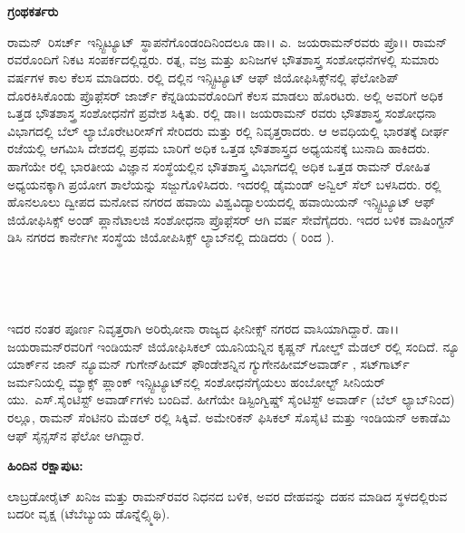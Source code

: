 
\newpage
~ 

\thispagestyle{empty}

~\phantom{a}



\noindent
\begin{minipage}[c]{6cm}
\textbf{\large{ಗ್ರಂಥಕರ್ತರು}}

\medskip
\medskip

{\parfillskip=0pt
ರಾಮನ್~ರಿಸರ್ಚ್~ಇನ್ಸ್ಟಿಟ್ಯೂಟ್~ಸ್ಥಾಪನೆಗೊಂಡಂದಿ\enginline{-}\break ನಿಂದಲೂ ಡಾ।। ಎ.~ಜಯರಾಮನ್‍‌ರವರು ಪ್ರೊ।। ರಾಮನ್ ರವರೊಂದಿಗೆ ನಿಕಟ ಸಂಪರ್ಕದಲ್ಲಿದ್ದರು. ರತ್ನ, ವಜ್ರ ಮತ್ತು ಖನಿಜಗಳ ಭೌತಶಾಸ್ತ್ರ ಸಂಶೋಧನೆಗಳಲ್ಲಿ ಸುಮಾರು  ವರ್ಷಗಳ ಕಾಲ ಕೆಲಸ ಮಾಡಿದರು.  ರಲ್ಲಿ  ದಲ್ಲಿನ ಇನ್ಸ್ಟಿಟ್ಯೂಟ್ ಆಫ್ ಜಿಯೋಫಿಸಿಕ್ಸ್‌ನಲ್ಲಿ ಫೆಲೋಶಿಪ್ ‍ದೊರಕಿಸಿಕೊಂಡು ಪ್ರೊಫೆ಼ಸರ್ ಜಾರ್ಜ್ ಕೆನ್ನಡಿಯವರೊಂದಿಗೆ ಕೆಲಸ ಮಾಡಲು ಹೊರಟರು. ಅಲ್ಲಿ ಅವರಿಗೆ ಅಧಿಕ ಒತ್ತಡ ಭೌತಶಾಸ್ತ್ರ ಸಂಶೋಧನೆಗೆ ಪ್ರವೇಶ ಸಿಕ್ಕಿತು.  ರಲ್ಲಿ ಡಾ।। ಜಯರಾಮನ್ ರವರು ಭೌತಶಾಸ್ತ್ರ ಸಂಶೋಧನಾ ವಿಭಾಗದಲ್ಲಿ ಬೆಲ್ ಲ್ಯಾಬೊರೇಟರೀಸ್‌ಗೆ ಸೇರಿದರು ಮತ್ತು  ರಲ್ಲಿ ನಿವೃತ್ತರಾದರು. ಆ ಅವಧಿಯಲ್ಲಿ  ಭಾರತಕ್ಕೆ ದೀರ್ಘ ರಜೆಯಲ್ಲಿ ಆಗಮಿಸಿ ದೇಶದಲ್ಲಿ ಪ್ರಥಮ ಬಾರಿಗೆ ಅಧಿಕ ಒತ್ತಡ ಭೌತಶಾಸ್ತ್ರದ ಅಧ್ಯಯನಕ್ಕೆ ಬುನಾದಿ ಹಾಕಿದರು. ಹಾಗೆಯೇ  ರಲ್ಲಿ ಭಾರತೀಯ ವಿಜ್ಞಾನ ಸಂಸ್ಥೆಯಲ್ಲಿನ ಭೌತಶಾಸ್ತ್ರ ವಿಭಾಗದಲ್ಲಿ ಅಧಿಕ ಒತ್ತಡ ರಾಮನ್ ರೋಹಿತ ಅಧ‍್ಯಯನಕ್ಕಾಗಿ ಪ್ರಯೋಗ ಶಾಲೆಯನ್ನು ಸಜ್ಜುಗೊಳಿಸಿದರು. ಇದರಲ್ಲಿ ಡೈಮಂಡ್ ಅನ್ವಿಲ್ ಸೆಲ್ ಬಳಸಿದರು.  ರಲ್ಲಿ ಹೊನಲೂಲು ದ್ವೀಪದ ಮನೋವ ನಗರದ ಹವಾಯಿ ವಿಶ್ವವಿದ್ಯಾಲಯದಲ್ಲಿ ಹವಾಯಿಯನ್ ಇನ್ಸ್ಟಿಟ್ಯೂಟ್ ಆಫ್ ಜಿಯೋಫಿಸಿಕ್ಸ್ ಅಂಡ್ ಪ್ಲಾನೆಟಾಲಜಿ ಸಂಶೋಧನಾ ಪ್ರೊಫೆ಼ಸರ್ ಆಗಿ  ವರ್ಷ ಸೇವೆಗೈದರು. ಇದರ ಬಳಿಕ ವಾಷಿಂಗ್ಟನ್ ಡಿಸಿ ನಗರದ ಕಾರ್ನೇಗೀ ಸಂಸ್ಥೆಯ ಜಿಯೋಪಿಸಿಕ್ಸ್ ಲ್ಯಾಬ್‍ನಲ್ಲಿ ದುಡಿದರು ( ರಿಂದ ).\par} 
\end{minipage}

\newpage
~ 

\thispagestyle{empty}

~\phantom{a}



\noindent
\begin{minipage}[c]{6cm}
ಇದರ ನಂತರ ಪೂರ್ಣ ನಿವೃತ್ತರಾಗಿ ಅರಿಝೋನಾ ರಾಜ್ಯದ ಫೀನೀಕ್ಸ್ ನಗರದ ವಾಸಿಯಾಗಿದ್ದಾರೆ.  ಡಾ।। ಜಯರಾಮನ್‌ರವರಿಗೆ ಇಂಡಿಯನ್ ಜಿಯೋಫಿಸಿಕಲ್ ಯೂನಿಯನ್ನಿನ ಕೃಷ್ಣನ್ ಗೋಲ್ಡ್ ಮೆಡಲ್  ರಲ್ಲಿ ಸಂದಿದೆ. ನ್ಯೂ ಯಾರ್ಕ್‌ನ  ಜಾನ್ ನ್ಯೂಮನ್ ಗುಗೇನ್‌ಹೀಮ್ ಫೌಂಡೇಶನ್ನಿನ ಗ್ಯುಗೇನ‌ಹೀಮ್\break ಅವಾರ್ಡ್ , ಸಟ್‍ಗಾರ್ಟ್  ಜರ್ಮನಿಯಲ್ಲಿ ಮ್ಯಾಕ್ಸ್ ಪ್ಲಾಂಕ್ ಇನ್ಸ್ಟಿಟ್ಯೂಟ್‌ನಲ್ಲಿ ಸಂಶೋಧನೆ\break ಗೈಯಲು ಹಂಬೋಲ್ಟ್ ಸೀನಿಯರ್ ಯು.~ಎಸ್.\break ಸೈಂಟಿಸ್ಟ್ ಅವಾರ್ಡ್‌ಗಳು ಬಂದಿವೆ. ಹೀಗೆಯೇ ಡಿಸ್ಟಿಂಗ್ವಿಷ್ಡ್ ಸೈಂಟಿಸ್ಟ್ ಅವಾರ್ಡ್ (ಬೆಲ್ ಲ್ಯಾಬ್‍‌\break ನಿಂದ)  ರಲ್ಲೂ, ರಾಮನ್ ಸೆಂಟಿನರಿ ಮೆಡಲ್\break {} ರಲ್ಲಿ ಸಿಕ್ಕಿವೆ. ಅಮೇರಿಕನ್ ಫಿಸಿಕಲ್ ಸೊಸೈಟಿ ಮತ್ತು ಇಂಡಿಯನ್ ಅಕಾಡೆಮಿ ಆಫ್ ಸೈನ್ಸಸ್‌ನ ಫೆಲೋ ಆಗಿದ್ದಾರೆ. 

\medskip
\medskip

\noindent
\textbf{ಹಿಂದಿನ ರಕ್ಷಾಪುಟ: }

\medskip

\noindent
ಲಾಬ್ರಡೋರೈಟ್ ಖನಿಜ ಮತ್ತು ರಾಮನ್‌ರವರ ನಿಧನದ  ಬಳಿಕ, ಅವರ ದೇಹವನ್ನು ದಹನ ಮಾಡಿದ ಸ್ಥಳದಲ್ಲಿರುವ ಬದರೀ ವೃಕ್ಷ (ಟೆಬೆಬ್ಯುಯ ಡೊನ್ನೆಲ್\enginline{--}ಸ್ಮಿಥಿ).  
\end{minipage}
